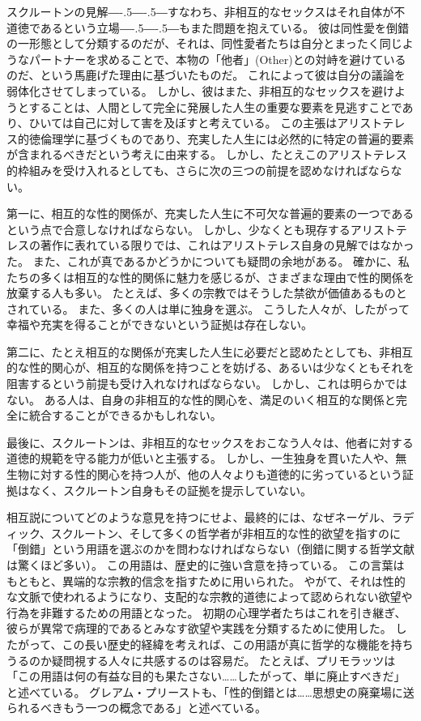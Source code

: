 \documentclass[paper=a4,book,openany]{jlreq}
\def\DDASH{―\kern-.5\zw―\kern-.5\zw―}
\begin{document}
スクルートンの見解{\DDASH}すなわち、非相互的なセックスはそれ自体が不道徳であるという立場{\DDASH}もまた問題を抱えている。
彼は同性愛を倒錯の一形態として分類するのだが、それは、同性愛者たちは自分とまったく同じようなパートナーを求めることで、本物の「他者」(Other)との対峙を避けているのだ、という馬鹿げた理由に基づいたものだ。
これによって彼は自分の議論を弱体化させてしまっている。
しかし、彼はまた、非相互的なセックスを避けようとすることは、人間として完全に発展した人生の重要な要素を見逃すことであり、ひいては自己に対して害を及ぼすと考えている。
この主張はアリストテレス的徳倫理学に基づくものであり、充実した人生には必然的に特定の普遍的要素が含まれるべきだという考えに由来する。
しかし、たとえこのアリストテレス的枠組みを受け入れるとしても、さらに次の三つの前提を認めなければならない。

第一に、相互的な性的関係が、充実した人生に不可欠な普遍的要素の一つであるという点で合意しなければならない。
しかし、少なくとも現存するアリストテレスの著作に表れている限りでは、これはアリストテレス自身の見解ではなかった。
また、これが真であるかどうかについても疑問の余地がある。
確かに、私たちの多くは相互的な性的関係に魅力を感じるが、さまざまな理由で性的関係を放棄する人も多い。
たとえば、多くの宗教ではそうした禁欲が価値あるものとされている。
また、多くの人は単に独身を選ぶ。
こうした人々が、したがって幸福や充実を得ることができないという証拠は存在しない。

第二に、たとえ相互的な関係が充実した人生に必要だと認めたとしても、非相互的な性的関心が、相互的な関係を持つことを妨げる、あるいは少なくともそれを阻害するという前提も受け入れなければならない。
しかし、これは明らかではない。
ある人は、自身の非相互的な性的関心を、満足のいく相互的な関係と完全に統合することができるかもしれない。

最後に、スクルートンは、非相互的なセックスをおこなう人々は、他者に対する道徳的規範を守る能力が低いと主張する。
しかし、一生独身を貫いた人や、無生物に対する性的関心を持つ人が、他の人々よりも道徳的に劣っているという証拠はなく、スクルートン自身もその証拠を提示していない。

相互説についてどのような意見を持つにせよ、最終的には、なぜネーゲル、ラディック、スクルートン、そして多くの哲学者が非相互的な性的欲望を指すのに「倒錯」という用語を選ぶのかを問わなければならない（倒錯に関する哲学文献は驚くほど多い）。
この用語は、歴史的に強い含意を持っている。
この言葉はもともと、異端的な宗教的信念を指すために用いられた。
やがて、それは性的な文脈で使われるようになり、支配的な宗教的道徳によって認められない欲望や行為を非難するための用語となった。
初期の心理学者たちはこれを引き継ぎ、彼らが異常で病理的であるとみなす欲望や実践を分類するために使用した。
したがって、この長い歴史的経緯を考えれば、この用語が真に哲学的な機能を持ちうるのか疑問視する人々に共感するのは容易だ。
たとえば、プリモラッツは「この用語は何の有益な目的も果たさない……したがって、単に廃止すべきだ」と述べている\citep[p.64]{primoratz99:_ethic_and_sex}。
グレアム・プリーストも、「性的倒錯とは……思想史の廃棄場に送られるべきもう一つの概念である」と述べている\citep[p.371]{priest97:_sexual_perver}。
\end{document}
